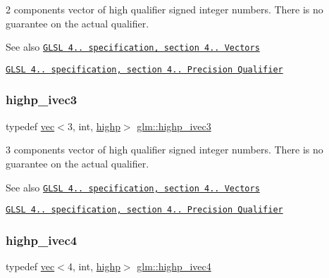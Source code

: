 2 components vector of high qualifier signed integer numbers. There is no guarantee on the actual qualifier.

\begin{DoxySeeAlso}{See also}
\href{http://www.opengl.org/registry/doc/GLSLangSpec.4.20.8.pdf}{\tt G\+L\+SL 4.. specification, section 4.. Vectors} 

\href{http://www.opengl.org/registry/doc/GLSLangSpec.4.20.8.pdf}{\tt G\+L\+SL 4.. specification, section 4.. Precision Qualifier} 
\end{DoxySeeAlso}
\mbox{\label{group__core__precision_ga52ba3edf3183078cf4129e6193b32a2c}} 
\subsubsection{\texorpdfstring{highp\+\_\+ivec3}{highp\_ivec3}}
{\footnotesize\ttfamily typedef \mbox{\hyperlink{structglm_1_1vec}{vec}}$<$3, int, \mbox{\hyperlink{namespaceglm_a36ed105b07c7746804d7fdc7cc90ff25ac6f7eab42eacbb10d59a58e95e362074}{highp}}$>$ \mbox{\hyperlink{group__core__precision_ga52ba3edf3183078cf4129e6193b32a2c}{glm\+::highp\+\_\+ivec3}}}

3 components vector of high qualifier signed integer numbers. There is no guarantee on the actual qualifier.

\begin{DoxySeeAlso}{See also}
\href{http://www.opengl.org/registry/doc/GLSLangSpec.4.20.8.pdf}{\tt G\+L\+SL 4.. specification, section 4.. Vectors} 

\href{http://www.opengl.org/registry/doc/GLSLangSpec.4.20.8.pdf}{\tt G\+L\+SL 4.. specification, section 4.. Precision Qualifier} 
\end{DoxySeeAlso}
\mbox{\label{group__core__precision_gaff761e336e3b52f04e725fa85c6d36d1}} 
\subsubsection{\texorpdfstring{highp\+\_\+ivec4}{highp\_ivec4}}
{\footnotesize\ttfamily typedef \mbox{\hyperlink{structglm_1_1vec}{vec}}$<$4, int, \mbox{\hyperlink{namespaceglm_a36ed105b07c7746804d7fdc7cc90ff25ac6f7eab42eacbb10d59a58e95e362074}{highp}}$>$ \mbox{\hyperlink{group__core__precision_gaff761e336e3b52f04e725fa85c6d36d1}{glm\+::highp\+\_\+ivec4}}}

